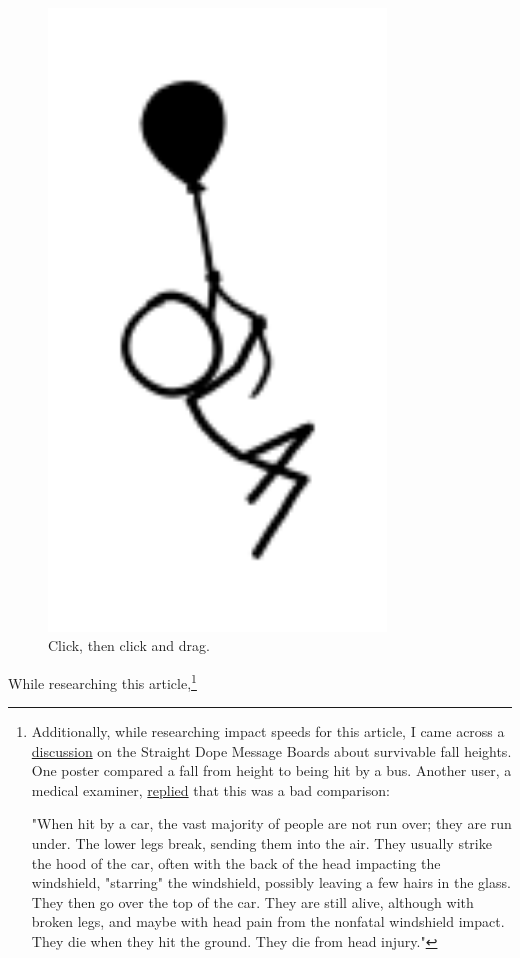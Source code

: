 {\begin{figure}[!htbp]
\centering
\includegraphics[scale=0.5, max width=0.8\textwidth]{imgs/a/62/balloon_float.png}
\caption{Click, then click and drag.}
\end{figure}

{While researching this article,{\footnote{Additionally, while researching impact speeds for this article, I came across a \href{http://boards.straightdope.com/sdmb/showthread.php?t=361878}{discussion} on the Straight Dope Message Boards about survivable fall heights. One poster compared a fall from height to being hit by a bus. Another user, a medical examiner, \href{http://boards.straightdope.com/sdmb/showpost.php?p=7180162&postcount=40}{replied} that this was a bad comparison:

"When hit by a car, the vast majority of people are not run over; they are run under. The lower legs break, sending them into the air. They usually strike the hood of the car, often with the back of the head impacting the windshield, "starring" the windshield, possibly leaving a few hairs in the glass. They then go over the top of the car. They are still alive, although with broken legs, and maybe with head pain from the nonfatal windshield impact. They die when they hit the ground. They die from head injury."

}}}}
